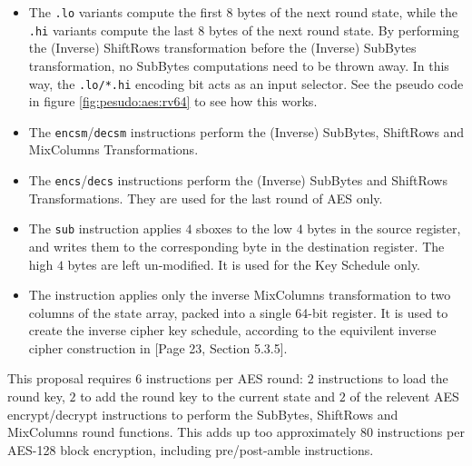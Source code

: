 \begin{itemize}
\item
The {\tt *.lo} variants compute the first 8 bytes of the next round
state, while the {\tt *.hi} variants compute the last 8 bytes of the
next round state.
By performing the (Inverse) ShiftRows transformation before the
(Inverse) SubBytes transformation, no SubBytes computations need to be
thrown away.
In this way, the {\tt *.lo/*.hi} encoding bit acts as an input selector.
See the pseudo code in figure \ref{fig:pesudo:aes:rv64} to see how this works.
\item
The {\tt encsm}/{\tt decsm} instructions perform the (Inverse) SubBytes,
ShiftRows and MixColumns Transformations.
\item
The {\tt encs}/{\tt decs} instructions perform the (Inverse) SubBytes and
ShiftRows Transformations. They are used for the last round of AES only.
\item
The {\tt sub} instruction applies $4$ sboxes to the low
$4$ bytes in the source register, and writes them to the corresponding
byte in the destination register.
The high $4$ bytes are left un-modified.
It is used for the Key Schedule only.
\item
The  instruction applies only the inverse MixColumns
transformation to two columns of the state array, packed into a single
64-bit register.
It is used to create the inverse cipher key schedule, according to
the equivilent inverse cipher construction in
\cite{nist:fips:197}[Page 23, Section 5.3.5].
\end{itemize}

This proposal requires $6$ instructions per AES round:
$2$  instructions to load the round key,
$2$  to add the round key to the current state
and
$2$ of the relevent AES encrypt/decrypt instructions to perform the
    SubBytes, ShiftRows and MixColumns round functions.
This adds up too approximately $80$ instructions per AES-128 block
encryption, including pre/post-amble instructions.

